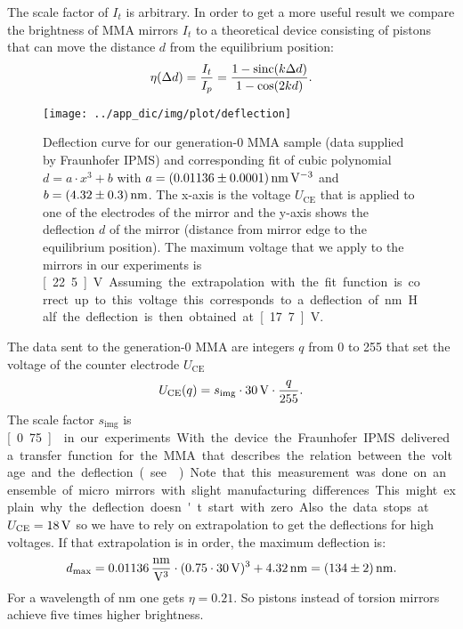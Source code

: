 The scale factor of $I_t$ is arbitrary. In order to get a more useful
result we compare the brightness of MMA mirrors $I_t$ to a theoretical
device consisting of pistons that can move the distance $d$ from the
equilibrium position:
\begin{align}
\label{eqn:eta}
  \eta(\Delta d)=\frac{I_t}{I_p}=\frac{1-\operatorname*{sinc}(k\Delta d)}{1-\cos(2kd)}.
\end{align}
\begin{figure}[ht]
  \centering
  \texttt{[image: ../app\_dic/img/plot/deflection]}
  \caption{Deflection curve for our generation-0 MMA sample (data
    supplied by Fraunhofer IPMS) and corresponding fit of cubic polynomial
    $d=a\cdot x^3+b$ with $a=\unit[(0.01136\pm0.0001)]{nm\, V^{-3}}$
    and $b=\unit[(4.32\pm0.3)]{nm}$. The x-axis is the voltage
    $U_\textrm{CE}$ that is applied to one of the electrodes of the mirror
    and the y-axis shows the deflection $d$ of the mirror (distance
    from mirror edge to the equilibrium position). The maximum voltage
    that we apply to the mirrors in our experiments is
    \unit[22.5]{V}. Assuming the extrapolation with the fit function
    is correct up to this voltage this corresponds to a deflection of
    \unit[134]{nm}. Half the deflection is then obtained at
    \unit[17.7]{V}. }
  \label{fig:deflection}
\end{figure}
The data sent to the generation-0 MMA are integers $q$ from 0 to 255
that set the voltage of the counter electrode $U_\textrm{CE}$
\begin{align}
U_\textrm{CE}(q)=s_\textrm{img}\cdot \unit[30]{V} \cdot \frac{q}{255}.
\end{align}
The scale factor $s_\textrm{img}$ is \unit[0.75]{} in our experiments.
With the device the Fraunhofer~IPMS delivered a transfer function for
the MMA that describes the relation between the voltage and the
deflection (see ). Note that this measurement
was done on an ensemble of micro mirrors with slight manufacturing
differences. This might explain why the deflection doesn't start with
zero. Also the data stops at $U_\textrm{CE}=\unit[18]{V}$ so we have
to rely on extrapolation to get the deflections for high voltages. If
that extrapolation is in order, the maximum deflection is:
\begin{align}
\label{eqn:dmax}
d_\textrm{max}=\unit[0.01136]{\frac{nm}{V^3}}\cdot(0.75\cdot\unit[30]{V})^3+\unit[4.32]{nm}
=\unit[(134\pm2)]{nm}.
\end{align}
For a wavelength of \unit[480]{nm} one gets $\eta=0.21$. So pistons
instead of torsion mirrors achieve five times higher brightness.


